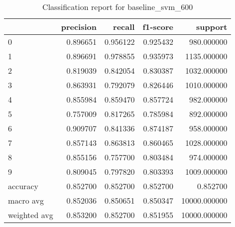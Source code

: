 \begin{table}[htb!]
\centering
\caption{Classification report for baseline_svm_600}
\label{tab:classification-report-baseline_svm_600}
\begin{tabular}{lrrrr}
\toprule
 & precision & recall & f1-score & support \\
\midrule
0 & 0.896651 & 0.956122 & 0.925432 & 980.000000 \\
1 & 0.896691 & 0.978855 & 0.935973 & 1135.000000 \\
2 & 0.819039 & 0.842054 & 0.830387 & 1032.000000 \\
3 & 0.863931 & 0.792079 & 0.826446 & 1010.000000 \\
4 & 0.855984 & 0.859470 & 0.857724 & 982.000000 \\
5 & 0.757009 & 0.817265 & 0.785984 & 892.000000 \\
6 & 0.909707 & 0.841336 & 0.874187 & 958.000000 \\
7 & 0.857143 & 0.863813 & 0.860465 & 1028.000000 \\
8 & 0.855156 & 0.757700 & 0.803484 & 974.000000 \\
9 & 0.809045 & 0.797820 & 0.803393 & 1009.000000 \\
accuracy & 0.852700 & 0.852700 & 0.852700 & 0.852700 \\
macro avg & 0.852036 & 0.850651 & 0.850347 & 10000.000000 \\
weighted avg & 0.853200 & 0.852700 & 0.851955 & 10000.000000 \\
\bottomrule
\end{tabular}
\end{table}
